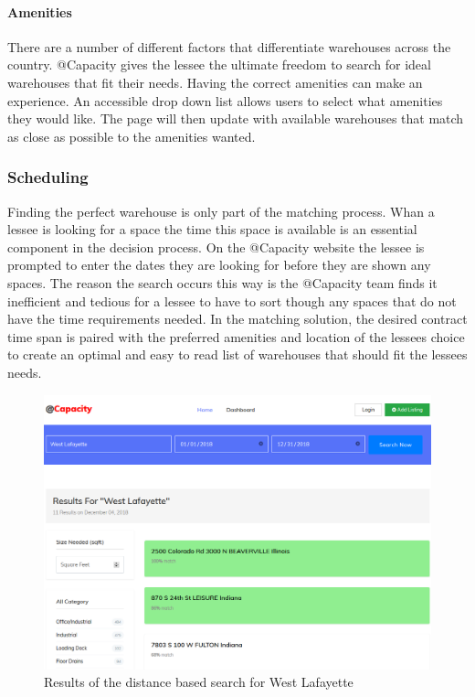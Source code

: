 \paragraph{Amenities}
There are a number of different factors that differentiate warehouses across the country. @Capacity gives the lessee the ultimate freedom to search for ideal warehouses that fit their needs. Having the correct amenities can make an experience. An accessible drop down list allows users to select what amenities they would like. The page will then update with available warehouses that match as close as possible to the amenities wanted. 


\subsubsection{Scheduling}
Finding the perfect warehouse is only part of the matching process. Whan a lessee is looking for a space the time this space is available is an essential component in the decision process. On the @Capacity website the lessee is prompted to enter the dates they are looking for before they are shown any spaces. The reason the search occurs this way is the @Capacity team finds it inefficient and tedious for a lessee to have to sort though any spaces that do not have the time requirements needed. In the matching solution, the desired contract time span is paired with the preferred amenities and location of the lessees choice to create an optimal and easy to read list of warehouses that should fit the lessees needs.  


\begin{figure}[H]
\centering
\includegraphics[width=.75\textwidth]{Phase_3/distance}
\caption{Results of the distance based search for West Lafayette}
\label{fig:distance}
\end{figure}


